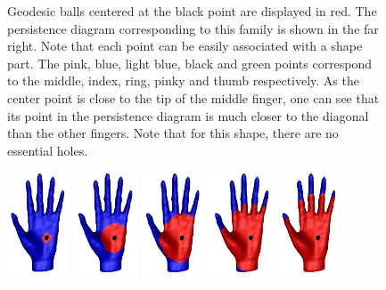 \begin{figure}[t!]
\begin{center}
\caption[Geodesic balls]{\label{fig:geodesic-ball1} Geodesic balls centered at the
  black point are displayed in red. The persistence diagram
  corresponding to this family is shown in the far right. Note that each
  point can be easily associated with a shape part. The pink, blue,
  light blue, black and green points correspond to the middle, index,
  ring, pinky and thumb respectively. As the center point is close to
  the tip of the middle finger, one can see that its point in the persistence diagram
  is much closer to the diagonal than the other fingers. Note that
  for this shape, there are no essential holes.}
\end{center}
\end{figure}

%
\begin{figure}[t!] 
\begin{center} 
\includegraphics[height = 3.3cm]{figures/dist7} 
\includegraphics[height = 3.3cm]{figures/dist8} 
\includegraphics[height = 3.3cm]{figures/dist9}
\includegraphics[height = 3.3cm]{figures/dist10} 
\includegraphics[height = 3.3cm]{figures/dist11} 

\end{center}
\end{figure}
